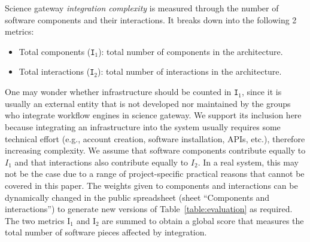 \documentclass[preprint,3p,twocolumn]{elsarticle}
\newcommand{\correction}[1]{\color{blue}#1\color{black}\xspace}
\begin{document}
Science gateway \emph{integration complexity} is measured through the number of software components and their interactions. It breaks
down into the following 2 metrics:
\begin{itemize}[leftmargin=0cm,itemindent=0.35cm,itemsep=0cm]
\item Total components (\texttt{I$_1$}): total number of components in
  the architecture.
\item Total interactions (\texttt{I$_2$}): total number of
  interactions in the architecture.
\end{itemize}
One may wonder whether infrastructure should be counted in
\texttt{I$_1$}, since it is usually an external entity that is not developed nor maintained by the groups who
integrate workflow engines in science gateway. We support its inclusion here because integrating an
infrastructure into the system usually requires some technical
effort (e.g., account creation, software installation, APIs, etc.), therefore increasing complexity. \correction{We assume that software components contribute equally to $I_1$ and that interactions also contribute equally to $I_2$. In a real system, this may not be the case due to a range of project-specific practical reasons that cannot be covered in this paper. The weights given to components and interactions can be dynamically changed in the public spreadsheet (sheet ``Components and interactions'') to generate new versions of Table~\ref{table:evaluation} as required.} The two metrics \correction{I$_1$ and I$_2$} are summed to obtain a
global score that measures the
total number of software pieces affected by integration. 
\end{document}
